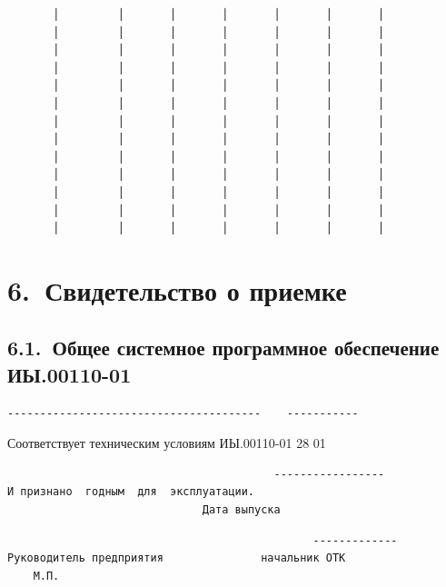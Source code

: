 \documentclass[11pt,a4paper]{article}
\begin{document}
\begin{center}
\begin{BVerbatim}
       │         │       │       │       │       │       │
       │         │       │       │       │       │       │
       │         │       │       │       │       │       │
       │         │       │       │       │       │       │
       │         │       │       │       │       │       │
       │         │       │       │       │       │       │
       │         │       │       │       │       │       │
       │         │       │       │       │       │       │
       │         │       │       │       │       │       │
       │         │       │       │       │       │       │
       │         │       │       │       │       │       │
       │         │       │       │       │       │       │
       │         │       │       │       │       │       │
\end{BVerbatim}
\end{center}

\section*{6.~Свидетельство о приемке}
\subsection*{6.1.~Общее системное программное обеспечение ИЫ.00110-01}
\begin{center}\small
\begin{BVerbatim}
---------------------------------------    -----------
\end{BVerbatim}
\end{center}

Соответствует техническим условиям ИЫ.00110-01 28 01

\begin{center}\small
\begin{BVerbatim}
                                         -----------------
И признано  годным  для  эксплуатации.
                              Дата выпуска
\end{BVerbatim}
\end{center}

\begin{center}\small
\begin{BVerbatim}
                                               -------------
Руководитель предприятия               начальник ОТК
    М.П.
\end{BVerbatim}
\end{center}
\end{document}
